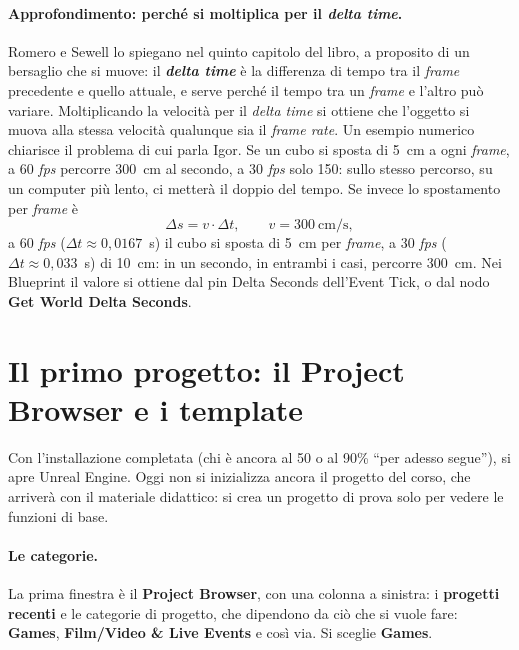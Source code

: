 \paragraph{Approfondimento: perché si moltiplica per il \emph{delta time}.} Romero e
Sewell lo spiegano nel quinto capitolo del libro, a proposito di un bersaglio che si
muove: il \textbf{\emph{delta time}} è la differenza di tempo tra il \emph{frame}
precedente e quello attuale, e serve perché il tempo tra un \emph{frame} e l'altro può
variare. Moltiplicando la velocità per il \emph{delta time} si ottiene che l'oggetto si
muova alla stessa velocità qualunque sia il \emph{frame rate}. Un esempio numerico
chiarisce il problema di cui parla Igor. Se un cubo si sposta di 5~cm a ogni
\emph{frame}, a 60 \emph{fps} percorre 300~cm al secondo, a 30 \emph{fps} solo 150: sullo
stesso percorso, su un computer più lento, ci metterà il doppio del tempo. Se invece lo
spostamento per \emph{frame} è
\[
  \Delta s = v \cdot \Delta t, \qquad v = 300~\text{cm/s},
\]
a 60 \emph{fps} ($\Delta t \approx 0{,}0167$~s) il cubo si sposta di 5~cm per
\emph{frame}, a 30 \emph{fps} ($\Delta t \approx 0{,}033$~s) di 10~cm: in un secondo,
in entrambi i casi, percorre 300~cm. Nei Blueprint il valore si ottiene dal pin Delta
Seconds dell'Event Tick, o dal nodo \textbf{Get World Delta Seconds}.

\section{Il primo progetto: il Project Browser e i template}
\label{ue1:sec:progetto}

Con l'installazione completata (chi è ancora al 50 o al 90\% ``per adesso segue''),
si apre Unreal Engine. Oggi non si inizializza ancora il progetto del corso, che
arriverà con il materiale didattico: si crea un progetto di prova solo per vedere le
funzioni di base.

\paragraph{Le categorie.} La prima finestra è il \textbf{Project Browser}, con una
colonna a sinistra: i \textbf{progetti recenti} e le categorie di progetto, che
dipendono da ciò che si vuole fare: \textbf{Games}, \textbf{Film/Video \& Live Events}
e così via. Si sceglie \textbf{Games}.

